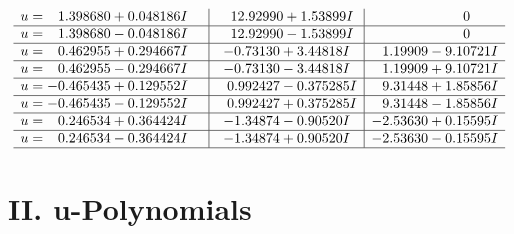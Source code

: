 \documentclass[1p]{elsarticle_modified}
\theoremstyle{definition}
\begin{document}
$$\begin{array}{c|c|c}
\begin{aligned}
u &= \phantom{-}1.398680 + 0.048186 I\end{aligned}
 & \phantom{-}12.92990 + 1.53899 I & \phantom{-0.000000 } 0 \\ \hline\begin{aligned}
u &= \phantom{-}1.398680 - 0.048186 I\end{aligned}
 & \phantom{-}12.92990 - 1.53899 I & \phantom{-0.000000 } 0 \\ \hline\begin{aligned}
u &= \phantom{-}0.462955 + 0.294667 I\end{aligned}
 & -0.73130 + 3.44818 I & \phantom{-}1.19909 - 9.10721 I \\ \hline\begin{aligned}
u &= \phantom{-}0.462955 - 0.294667 I\end{aligned}
 & -0.73130 - 3.44818 I & \phantom{-}1.19909 + 9.10721 I \\ \hline\begin{aligned}
u &= -0.465435 + 0.129552 I\end{aligned}
 & \phantom{-}0.992427 - 0.375285 I & \phantom{-}9.31448 + 1.85856 I \\ \hline\begin{aligned}
u &= -0.465435 - 0.129552 I\end{aligned}
 & \phantom{-}0.992427 + 0.375285 I & \phantom{-}9.31448 - 1.85856 I \\ \hline\begin{aligned}
u &= \phantom{-}0.246534 + 0.364424 I\end{aligned}
 & -1.34874 - 0.90520 I & -2.53630 + 0.15595 I \\ \hline\begin{aligned}
u &= \phantom{-}0.246534 - 0.364424 I\end{aligned}
 & -1.34874 + 0.90520 I & -2.53630 - 0.15595 I\\
 \hline 
 \end{array}$$\newpage
\newpage\renewcommand{\arraystretch}{1}
\centering \section*{ II. u-Polynomials}
\end{document}
